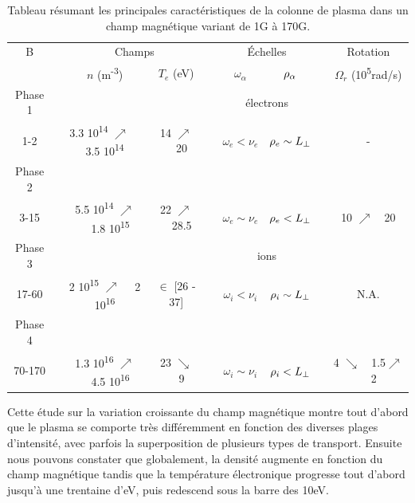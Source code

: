 \begin{refsection}
\begin{table}
\footnotesize\centering
{}
\begin{tabular}{@{}ccccccccc@{}}\toprule
B&&\multicolumn{2}{c}{Champs}&&\multicolumn{2}{c}{Échelles} &&
Rotation\\
\cmidrule{3-4} \cmidrule{6-7} \cmidrule{9-9}
&& $n$ (m\textsuperscript{-3}) & $T_e$ (eV)&& $\omega_\alpha$
&$\rho{_{\alpha}}$&& $\Omega_r$ (10\textsuperscript{5}rad/s)\\
\midrule Phase 1&&&&&\multicolumn{2}{c}{électrons}\\
\scriptsize 1-2 &&\scriptsize 3.3 10\textsuperscript{14} $\nearrow$~~
\scriptsize 3.5 10\textsuperscript{14} &\scriptsize14 $\nearrow$~~\scriptsize 20 &&
$\omega_e<\nu_e$ &\scriptsize$\rho{_{e}}\sim L_\perp$ && \scriptsize -
\\
Phase 2\\
\scriptsize 3-15 &&\scriptsize 5.5 10\textsuperscript{14}
$\nearrow$~~\scriptsize 1.8 10\textsuperscript{15} &\scriptsize22
$\nearrow$~~\scriptsize 28.5 && $\omega_e\sim\nu_e$ &\scriptsize$\rho{_{e}}<
L_\perp$ && \scriptsize 10 $\nearrow$~~\scriptsize20
\\
Phase 3 &&&&&\multicolumn{2}{c}{ions}\\
\scriptsize 17-60 &&\scriptsize 2 10\textsuperscript{15} $\nearrow$~~\scriptsize
2 10\textsuperscript{16} &\scriptsize$\in$ \scriptsize [26 - \scriptsize 37]
&& $\omega_i<\nu_i$ &\scriptsize$\rho{_{i}}\sim L_\perp$ && \scriptsize N.A.
\\
Phase 4 \\
\scriptsize 70-170 &&\scriptsize 1.3 10\textsuperscript{16}
$\nearrow$~~\scriptsize 4.5 10\textsuperscript{16} &\scriptsize23
$\searrow$~~\scriptsize 9 && $\omega_i\sim\nu_i$ &\scriptsize$\rho{_{i}}<
L_\perp$ && \scriptsize 4 $\searrow$~~\scriptsize1.5$\nearrow$~~\scriptsize2
\\
\bottomrule
\end{tabular}
\caption{Tableau résumant les principales
caractéristiques de la colonne de plasma dans un champ
magnétique variant de 1G à 170G.}\label{4-CybeleVarMagTab}
\end{table}

Cette étude sur la variation croissante du champ magnétique montre tout d'abord
que le plasma se comporte très différemment en fonction des diverses plages
d'intensité, avec parfois la superposition de plusieurs types de transport.
Ensuite nous pouvons constater que globalement, la densité augmente en fonction
du champ magnétique tandis que la température électronique progresse tout
d'abord jusqu'à une trentaine d'eV, puis redescend sous la barre des 10eV. 


\end{refsection}
